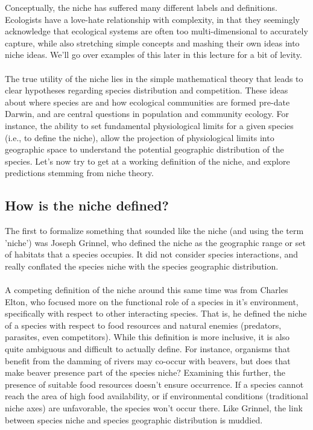 \documentclass[12pt]{article}
\begin{document}
Conceptually, the niche has suffered many different labels and definitions. Ecologists have a love-hate relationship with complexity, in that they seemingly acknowledge that ecological systems are often too multi-dimensional to accurately capture, while also stretching simple concepts and mashing their own ideas into niche ideas. We'll go over examples of this later in this lecture for a bit of levity. 




\paragraph*{}
The true utility of the niche lies in the simple mathematical theory that leads to clear hypotheses regarding species distribution and competition. These ideas about where species are and how ecological communities are formed pre-date Darwin, and are central questions in population and community ecology. For instance, the ability to set fundamental physiological limits for a given species (i.e., to define the niche), allow the projection of physiological limits into geographic space to understand the potential geographic distribution of the species. Let's now try to get at a working definition of the niche, and explore predictions stemming from niche theory. 












\subsection*{How is the niche defined?} 

The first to formalize something that sounded like the niche (and using the term 'niche') was Joseph Grinnel, who defined the niche as the geographic range or set of habitats that a species occupies. It did not consider species interactions, and really conflated the species niche with the species geographic distribution. 


\paragraph*{}
A competing definition of the niche around this same time was from Charles Elton, who focused more on the functional role of a species in it's environment, specifically with respect to other interacting species. That is, he defined the niche of a species with respect to food resources and natural enemies (predators, parasites, even competitors). While this definition is more inclusive, it is also quite ambiguous and difficult to actually define. For instance, organisms that benefit from the damming of rivers may co-occur with beavers, but does that make beaver presence part of the species niche? Examining this further, the presence of suitable food resources doesn't ensure occurrence. If a species cannot reach the area of high food availability, or if environmental conditions (traditional niche axes) are unfavorable, the species won't occur there. Like Grinnel, the link between species niche and species geographic distribution is muddied. 
\end{document}
